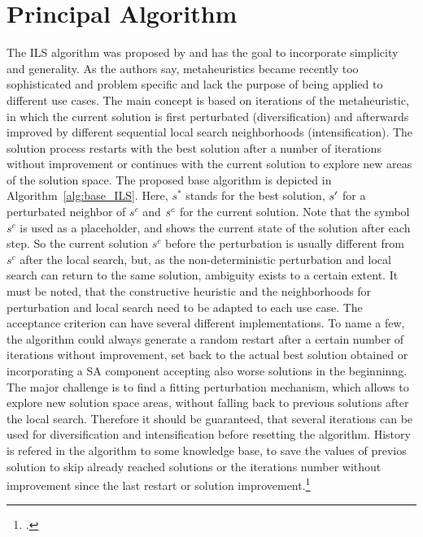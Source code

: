 \section{Principal Algorithm}
\label{sec:algorithm}
The \gls{ILS} algorithm was proposed by \cite{lourenco_iterated_2003} and has the goal to incorporate simplicity and generality.
As the authors say, metaheuristics became recently too sophisticated and problem specific and lack the purpose of
being applied to different use cases. The main concept is based on iterations of the metaheuristic, in which the current
solution is first perturbated (diversification) and afterwards improved by different sequential local search neighborhoods
(intensification). The solution process restarts with the best solution after a number of iterations without improvement
or continues with the current solution to explore new areas of the solution space.
The proposed base algorithm is depicted in Algorithm~\ref{alg:base_ILS}. Here, $s^*$ stands for the best solution, $s\sp{\prime}$
for a perturbated neighbor of $s^c$ and $s\sp{c}$ for the current solution. Note that the symbol $s^c$
is used as a placeholder, and shows the current state of the solution after each step. So the current solution
$s^c$ before the perturbation is usually different from $s^c$ after the local search, but, as the non-deterministic
perturbation and local search can return to the same solution, ambiguity exists to a certain extent.
It must be noted, that the constructive heuristic and  the neighborhoods for perturbation and local search need to be adapted to
each use case. The acceptance criterion can have several different implementations. To name a few, the algorithm could always
generate a random restart after a certain number of iterations without improvement, set back to the actual best solution
obtained or incorporating a \gls{SA} component accepting also worse solutions in the beginninng. The major challenge is
to find a fitting perturbation mechanism, which allows to explore new solution space areas, without falling back to previous solutions
after the local search. Therefore it should be guaranteed, that several iterations can be used for diversification and
intensification before resetting the algorithm. History is refered in the algorithm to some knowledge base,
to save the values of previos solution to skip already reached solutions or the iterations number without improvement since the
last restart or solution improvement.\footcite[cf.][]{lourenco_iterated_2003}


